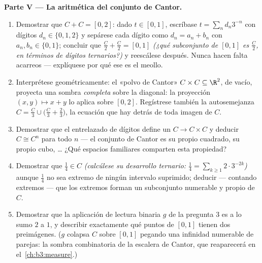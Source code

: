\begin{problem}
\medskip
\noindent\textbf{Parte V --- La aritmética del conjunto de Cantor.}
\begin{enumerate}[resume]
  \item Demostrar que $C + C = [0, 2]$: dado $t \in [0, 1]$, escríbase
  $t = \sum_n d_n3^{-n}$ con dígitos $d_n \in \{0,
        1, 2\}$ y sepárese cada dígito como $d_n = a_n + b_n$ con
  $a_n, b_n \in \{0, 1\}$; concluir que $\frac C2 +
        \frac C2 = [0, 1]$ \emph{(¿qué subconjunto de $[0,1]$ es
  $\frac C2$, en términos de dígitos ternarios?)} y reescálese después.
  Nunca hacen falta acarreos --- explíquese por qué ese es el meollo.
  \item Interprétese geométricamente: el «polvo de Cantor» $C \times
        C \subseteq \R^2$, de
   vacío, proyecta una sombra
  \emph{completa} sobre la diagonal: la proyección $(x,
        y) \mapsto x + y$ lo aplica sobre $[0, 2]$. Regístrese también
  la autosemejanza $C = \frac C3 \cup \bigl(\frac C3 +
        \frac23\bigr)$, la ecuación que hay detrás de toda imagen de
        $C$.
  \item Demostrar que el entrelazado de dígitos define un
   $C
        \to C \times C$ y deducir $C \cong C^n$ para todo $n$ --- el
  conjunto de Cantor es su propio cuadrado, su propio cubo, \dots{} ¿Qué
  espacios familiares comparten esta propiedad? \item Demostrar que
  $\frac14 \in C$ \emph{(calcúlese su desarrollo ternario:
  $\frac14 = \sum_{k\geq1} 2\cdot3^{-2k}$)} aunque $\frac14$ no sea
  extremo de ningún intervalo suprimido; deducir --- contando extremos
  --- que los extremos forman un subconjunto numerable y propio de $C$.
  \item Demostrar que la aplicación de lectura binaria $g$ de la
  pregunta 3 es a lo sumo $2$ a $1$, y describir exactamente qué puntos
  de $[0,1]$ tienen dos preimágenes. ($g$ colapsa $C$ sobre $[0,1]$
  pegando una infinidad numerable de parejas: la sombra combinatoria de
  la escalera de Cantor, que reaparecerá en el~\cref{ch:b3:measure}.)
\end{enumerate}


\end{problem}
